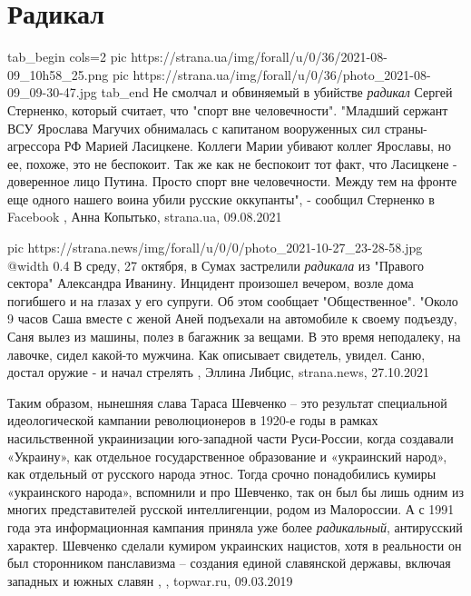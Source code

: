  
 
 
 
 
\chapter{Радикал}
\label{sec:slova.radikal}

\ifcmt
  tab_begin cols=2
     pic https://strana.ua/img/forall/u/0/36/2021-08-09_10h58_25.png
     pic https://strana.ua/img/forall/u/0/36/photo_2021-08-09_09-30-47.jpg
  tab_end
\fi
Не смолчал и обвиняемый в убийстве \emph{радикал} Сергей Стерненко, который считает,
что "спорт вне человечности".  "Младший сержант ВСУ Ярослава Магучих обнималась
с капитаном вооруженных сил страны-агрессора РФ Марией Ласицкене.  Коллеги
Марии убивают коллег Ярославы, но ее, похоже, это не беспокоит.  Так же как не
беспокоит тот факт, что Ласицкене - доверенное лицо Путина.  Просто спорт вне
человечности.  Между тем на фронте еще одного нашего воина убили русские
оккупанты", - сообщил Стерненко в Facebook
, 
Анна Копытько, strana.ua, 09.08.2021

\ifcmt
  pic https://strana.news/img/forall/u/0/0/photo_2021-10-27_23-28-58.jpg
  @width 0.4
\fi
В среду, 27 октября, в Сумах застрелили \emph{радикала} из "Правого сектора"
Александра Иванину. Инцидент произошел вечером, возле дома погибшего и на
глазах у его супруги.  Об этом сообщает "Общественное".  "Около 9 часов Саша
вместе с женой Аней подъехали на автомобиле к своему подъезду, Саня вылез из
машины, полез в багажник за вещами. В это время неподалеку, на лавочке, сидел
какой-то мужчина. Как описывает свидетель, увидел. Саню, достал оружие - и
начал стрелять
, 
Эллина Либцис, strana.news, 27.10.2021

Таким образом, нынешняя слава Тараса Шевченко – это результат специальной
идеологической кампании революционеров в 1920-е годы в рамках насильственной
украинизации юго-западной части Руси-России, когда создавали «Украину», как
отдельное государственное образование и «украинский народ», как отдельный от
русского народа этнос. Тогда срочно понадобились кумиры «украинского народа»,
вспомнили и про Шевченко, так он был бы лишь одним из многих представителей
русской интеллигенции, родом из Малороссии. А с 1991 года эта информационная
кампания приняла уже более \emph{радикальный}, антирусский характер. Шевченко сделали
кумиром украинских нацистов, хотя в реальности он был сторонником панславизма –
создания единой славянской державы, включая западных и южных славян
, , topwar.ru, 09.03.2019
